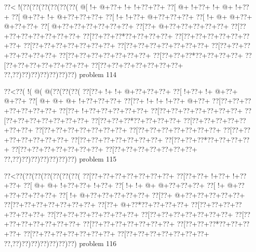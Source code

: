 \vbox{\vbox{\goo
\0??<\- !(\0??(\0??(\0??(\0??(\0??(\0??(
\- @[\- !+\- @+\0??+\- !+\- !+\0??+\0??+
\0??[\- @+\- !+\0??+\- !+\- @+\- !+\0??+
\0??[\- @+\0??+\- !+\- @+\0??+\0??+\0??+
\0??[\- !+\- !+\0??+\- @+\0??+\0??+\0??+
\0??[\- !+\- @+\- @+\0??+\- @+\0??+\0??+
\0??[\- @+\0??+\0??+\0??+\0??+\0??+\0??+
\0??[\0??+\- @+\0??+\0??+\0??+\0??+\0??+
\0??[\0??+\0??+\0??+\0??+\0??+\0??+\0??+
\0??[\0??+\0??+\0??*\0??+\0??+\0??+\0??+
\0??[\0??+\0??+\0??+\0??+\0??+\0??+\0??+
\0??[\0??+\0??+\0??+\0??+\0??+\0??+\0??+
\0??[\0??+\0??+\0??+\0??+\0??+\0??+\0??+
\0??[\0??+\0??+\0??+\0??+\0??+\0??+\0??+
\0??[\0??+\0??+\0??+\0??+\0??+\0??+\0??+
\0??[\0??+\0??+\0??*\0??+\0??+\0??+\0??+
\0??[\0??+\0??+\0??+\0??+\0??+\0??+\0??+
\0??[\0??+\0??+\0??+\0??+\0??+\0??+\0??+
\0??,\0??)\0??)\0??)\0??)\0??)\0??)\0??)
}
\hfil problem 114\hfil\break
}

\vbox{\vbox{\goo
\0??<\0??(\- !(\- @(\- @(\0??(\0??(\0??(
\0??[\0??+\- !+\- !+\- @+\0??+\0??+\0??+
\0??[\- !+\0??+\- !+\- @+\0??+\- @+\0??+
\0??[\- @+\- @+\- @+\- !+\0??+\0??+\0??+
\0??[\0??+\- !+\- !+\- !+\0??+\- @+\0??+
\0??[\0??+\0??+\0??+\0??+\0??+\0??+\0??+
\0??[\0??+\- !+\0??+\0??+\0??+\0??+\0??+
\0??[\0??+\0??+\0??+\0??+\0??+\0??+\0??+
\0??[\0??+\0??+\0??+\0??+\0??+\0??+\0??+
\0??[\0??+\0??+\0??*\0??+\0??+\0??+\0??+
\0??[\0??+\0??+\0??+\0??+\0??+\0??+\0??+
\0??[\0??+\0??+\0??+\0??+\0??+\0??+\0??+
\0??[\0??+\0??+\0??+\0??+\0??+\0??+\0??+
\0??[\0??+\0??+\0??+\0??+\0??+\0??+\0??+
\0??[\0??+\0??+\0??+\0??+\0??+\0??+\0??+
\0??[\0??+\0??+\0??*\0??+\0??+\0??+\0??+
\0??[\0??+\0??+\0??+\0??+\0??+\0??+\0??+
\0??[\0??+\0??+\0??+\0??+\0??+\0??+\0??+
\0??,\0??)\0??)\0??)\0??)\0??)\0??)\0??)
}
\hfil problem 115\hfil\break
}

\vbox{\vbox{\goo
\0??<\0??(\0??(\0??(\0??(\0??(\0??(\0??(
\0??[\0??+\0??+\0??+\0??+\0??+\0??+\0??+
\0??[\0??+\0??+\- !+\0??+\- !+\0??+\0??+
\0??[\- @+\- @+\- !+\0??+\0??+\- !+\0??+
\0??[\- !+\- !+\- @+\- @+\0??+\0??+\0??+
\0??[\- !+\- @+\0??+\0??+\0??+\0??+\0??+
\0??[\- !+\- @+\0??+\0??+\0??+\0??+\0??+
\0??[\0??+\- @+\0??+\0??+\0??+\0??+\0??+
\0??[\0??+\0??+\0??+\0??+\0??+\0??+\0??+
\0??[\0??+\- @+\0??*\0??+\0??+\0??+\0??+
\0??[\0??+\0??+\0??+\0??+\0??+\0??+\0??+
\0??[\0??+\0??+\0??+\0??+\0??+\0??+\0??+
\0??[\0??+\0??+\0??+\0??+\0??+\0??+\0??+
\0??[\0??+\0??+\0??+\0??+\0??+\0??+\0??+
\0??[\0??+\0??+\0??+\0??+\0??+\0??+\0??+
\0??[\0??+\0??+\0??*\0??+\0??+\0??+\0??+
\0??[\0??+\0??+\0??+\0??+\0??+\0??+\0??+
\0??[\0??+\0??+\0??+\0??+\0??+\0??+\0??+
\0??,\0??)\0??)\0??)\0??)\0??)\0??)\0??)
}
\hfil problem 116\hfil\break
}

